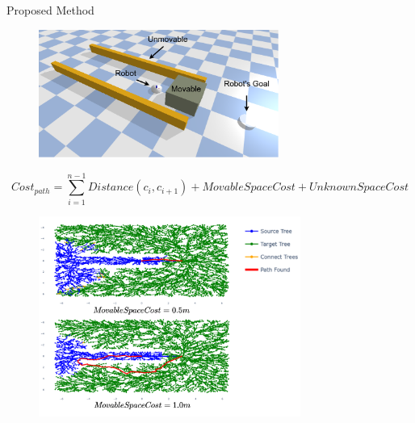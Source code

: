 \begin{frame}[fragile]{Proposed Method} 
\begin{center}
\begin{figure}[H]
\includegraphics[width=0.7\textwidth]{figures/proposed_method/push_or_drive}
\end{figure}
\end{center}\pause
  \[\mathit{Cost_{path}} =  \sum_{i=1}^{n-1} \mathit{Distance}(c_i, c_{i+1}) + \mathit{MovableSpaceCost} + \mathit{UnknownSpaceCost} \]
\end{frame}


\begin{frame}[fragile]{}
\begin{center}
\begin{figure}[H]
\vspace{-0.3cm}
\hspace{0.9cm}
\includegraphics[width=0.765\textwidth]{figures/proposed_method/push_or_drive_planned.drawio.png} 
\end{figure}
\end{center}
\end{frame}
